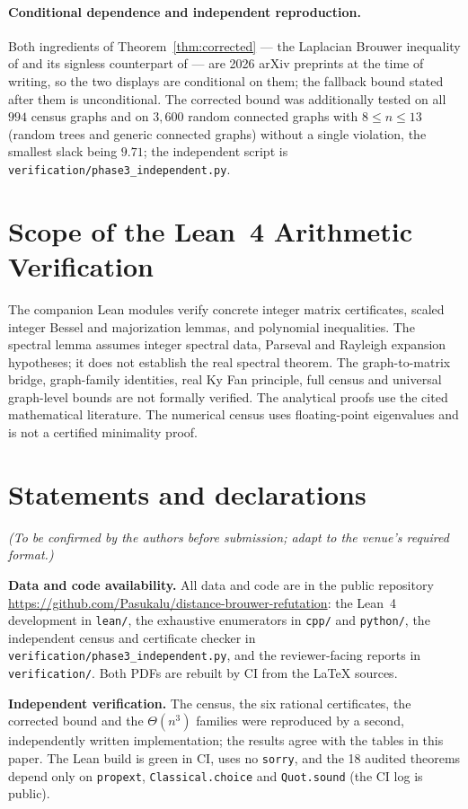 \documentclass[11pt,a4paper]{article}
\theoremstyle{remark}
\begin{document}
\paragraph{Conditional dependence and independent reproduction.}
Both ingredients of Theorem~\ref{thm:corrected} --- the Laplacian Brouwer inequality of \cite{KT2026} and its signless counterpart of \cite{SignlessBrouwer2026} --- are 2026 arXiv preprints at the time of writing, so the two displays are conditional on them; the fallback bound stated after them is unconditional. The corrected bound was additionally tested on all $994$ census graphs and on $3{,}600$ random connected graphs with $8 \le n \le 13$ (random trees and generic connected graphs) without a single violation, the smallest slack being $9.71$; the independent script is \texttt{verification/phase3\_independent.py}.

\section{Scope of the Lean~4 Arithmetic Verification}
The companion Lean modules verify concrete integer matrix certificates, scaled integer Bessel and majorization lemmas, and polynomial inequalities. The spectral lemma assumes integer spectral data, Parseval and Rayleigh expansion hypotheses; it does not establish the real spectral theorem. The graph-to-matrix bridge, graph-family identities, real Ky Fan principle, full census and universal graph-level bounds are not formally verified. The analytical proofs use the cited mathematical literature. The numerical census uses floating-point eigenvalues and is not a certified minimality proof.

\section*{Statements and declarations}
\emph{(To be confirmed by the authors before submission; adapt to the venue's required format.)}

\noindent\textbf{Data and code availability.}
All data and code are in the public repository \url{https://github.com/Pasukalu/distance-brouwer-refutation}: the Lean~4 development in \texttt{lean/}, the exhaustive enumerators in \texttt{cpp/} and \texttt{python/}, the independent census and certificate checker in \texttt{verification/phase3\_independent.py}, and the reviewer-facing reports in \texttt{verification/}. Both PDFs are rebuilt by CI from the \LaTeX{} sources.

\noindent\textbf{Independent verification.}
The census, the six rational certificates, the corrected bound and the $\Theta(n^3)$ families were reproduced by a second, independently written implementation; the results agree with the tables in this paper. The Lean build is green in CI, uses no \texttt{sorry}, and the 18 audited theorems depend only on \texttt{propext}, \texttt{Classical.choice} and \texttt{Quot.sound} (the CI log is public).
\end{document}

